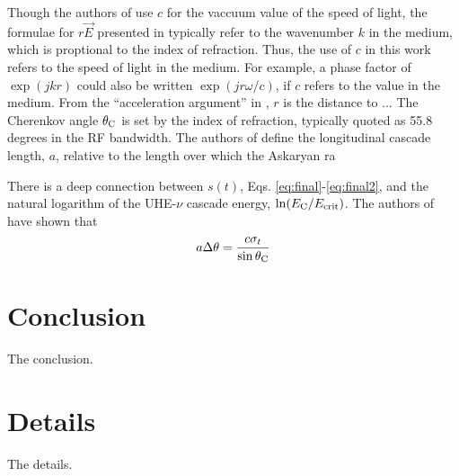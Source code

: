 \documentclass[amsmath,amssymb,aps,prd,10pt,twocolumn,showkeys]{revtex4}
\begin{document}
\begin{itemize}
Though the authors of \cite{10.1103/physrevd.65.016003} use $c$ for the vaccuum value of the speed of light, the formulae for $r \vec{E}$ presented in \cite{10.1103/physrevd.65.016003} typically refer to the wavenumber $k$ in the medium, which is proptional to the index of refraction. Thus, the use of $c$ in this work refers to the speed of light in the medium.  For example, a phase factor of $\exp(j k r)$ could also be written $\exp(j r \omega/c)$, if $c$ refers to the value in the medium.  From the ``acceleration argument'' in \cite{10.1103/physrevd.65.016003}, $r$ is the distance to ... The Cherenkov angle $\theta_{\rm C}$ is set by the index of refraction, typically quoted as 55.8 degrees in the RF bandwidth.  The authors of \cite{10.1103/physrevd.65.016003} define the longitudinal cascade length, $a$, relative to the length over which the Askaryan ra

There is a deep connection between $s(t)$, Eqs. \ref{eq:final}-\ref{eq:final2}, and the natural logarithm of the UHE-$\nu$ cascade energy, $\ln(E_{\rm C}/E_{\rm crit})$. The authors of \cite{PhysRevD.105.123019} have shown that
\begin{equation}
a\Delta\theta = \frac{c \sigma_t}{\sin\theta_{\rm C}}
\end{equation}
\end{itemize}

\section{Conclusion}
\label{sec:conc}

The conclusion.

\appendix

\section{Details}
\label{app:a}

The details.


\end{document}
